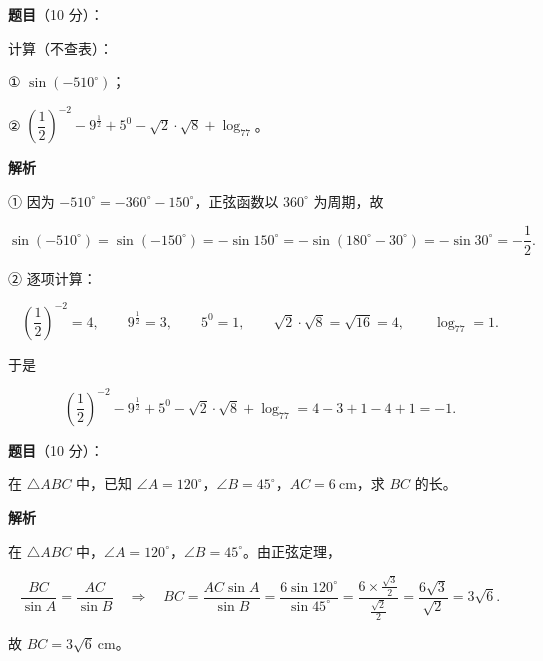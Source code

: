 \begin{answer}

\textbf{题目}（10 分）：

计算（不查表）：

① $\sin(-510^\circ)$；

② $\left(\dfrac12\right)^{-2}-9^{\frac12}+5^0-\sqrt2\cdot\sqrt8+\log_77$。

\textbf{解析}

① 因为 $-510^\circ=-360^\circ-150^\circ$，正弦函数以 $360^\circ$ 为周期，故

\nopagebreak[4]
\[
\sin(-510^\circ)=\sin(-150^\circ)=-\sin150^\circ=-\sin(180^\circ-30^\circ)=-\sin30^\circ=-\frac12.
\]

② 逐项计算：

\nopagebreak[4]
\[
\left(\frac12\right)^{-2}=4,\qquad
9^{\frac12}=3,\qquad
5^0=1,\qquad
\sqrt2\cdot\sqrt8=\sqrt{16}=4,\qquad
\log_77=1.
\]

于是

\nopagebreak[4]
\[
\left(\frac12\right)^{-2}-9^{\frac12}+5^0-\sqrt2\cdot\sqrt8+\log_77
=4-3+1-4+1=-1.
\]


\end{answer}
\begin{answer}

\textbf{题目}（10 分）：

在 $\triangle ABC$ 中，已知 $\angle A=120^\circ$，$\angle B=45^\circ$，$AC=6\ \mathrm{cm}$，求 $BC$ 的长。
\nopagebreak[4]
\begin{center}\end{center}
\nopagebreak[4]
\textbf{解析}

在 $\triangle ABC$ 中，$\angle A=120^\circ$，$\angle B=45^\circ$。由正弦定理，

\nopagebreak[4]
\[
\frac{BC}{\sin A}=\frac{AC}{\sin B}
\quad\Longrightarrow\quad
BC=\frac{AC\sin A}{\sin B}
=\frac{6\sin120^\circ}{\sin45^\circ}
=\frac{6\times\frac{\sqrt3}{2}}{\frac{\sqrt2}{2}}
=\frac{6\sqrt3}{\sqrt2}=3\sqrt6.
\]

故 $BC=3\sqrt6\ \mathrm{cm}$。


\end{answer}
